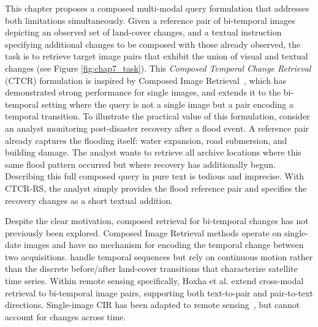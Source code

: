 This chapter proposes a composed multi-modal query
formulation that addresses both limitations simultaneously.
Given a reference pair of bi-temporal images depicting an
observed set of land-cover changes, and a textual instruction
specifying additional changes to be composed with those
already observed, the task is to retrieve target image pairs
that exhibit the union of visual and textual changes (see Figure \ref{fig:chap7_task}). This
\textit{Composed Temporal Change Retrieval} (CTCR)
formulation is inspired by Composed Image
Retrieval~\cite{song2025survey}, which has demonstrated
strong performance for single images, and extends it to the
bi-temporal setting where the query is not a single image
but a pair encoding a temporal transition. To illustrate
the practical value of this formulation, consider an analyst
monitoring post-disaster recovery after a flood event. A
reference pair already captures the flooding itself: water
expansion, road submersion, and building damage. The analyst
wants to retrieve all archive locations where this same
flood pattern occurred but where recovery has additionally
begun. Describing this full composed query in pure text is
tedious and imprecise. With CTCR-RS, the analyst simply
provides the flood reference pair and specifies the recovery
changes as a short textual addition.
 
Despite the clear motivation, composed retrieval for
bi-temporal changes has not previously been explored.
Composed Image Retrieval methods operate on single-date
images and have no mechanism for encoding the temporal
change between two acquisitions.
\textcite{ventura2024covr} handle temporal sequences but
rely on continuous motion rather than the discrete
before/after land-cover transitions that characterize
satellite time series. Within remote sensing specifically, Hoxha et al. \cite{hoxha2025selfsupervised}
extend cross-modal retrieval to bi-temporal image pairs,
supporting both text-to-pair and pair-to-text directions.
Single-image CIR has been adapted
to remote sensing~\cite{psomas2024cir, wang2024scene,
yang2025language}, but cannot account for changes across
time.
 
